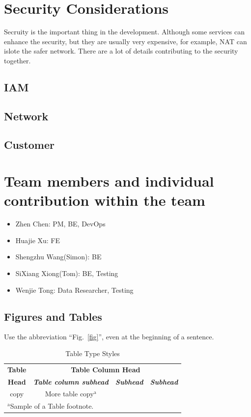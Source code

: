 \documentclass[conference]{IEEEtran}
\begin{document}
\section{Security Considerations}
Secruity is the important thing in the development. Although some services can enhance the security, but they are usually very expensive, for example, 
NAT can islote the safer network. There are a lot of details contributing to the security together.

\subsection{IAM}

\subsection{Network}

\subsection{Customer}



\section{Team members and individual contribution within the team}
\begin{itemize}
    \item Zhen Chen:  PM, BE, DevOps
    \item Huajie Xu: FE
    \item Shengzhu Wang(Simon): BE
    \item SiXiang Xiong(Tom): BE, Testing
    \item Wenjie Tong: Data Researcher, Testing
\end{itemize}


\subsection{Figures and Tables}
 Use the abbreviation 
``Fig.~\ref{fig}'', even at the beginning of a sentence.

\begin{table}[htbp]
\caption{Table Type Styles}
\begin{center}
\begin{tabular}{|c|c|c|c|}
\hline
\textbf{Table}&\multicolumn{3}{|c|}{\textbf{Table Column Head}} \\
\cline{2-4} 
\textbf{Head} & \textbf{\textit{Table column subhead}}& \textbf{\textit{Subhead}}& \textbf{\textit{Subhead}} \\
\hline
copy& More table copy$^{\mathrm{a}}$& &  \\
\hline
\multicolumn{4}{l}{$^{\mathrm{a}}$Sample of a Table footnote.}
\end{tabular}
\label{tab1}
\end{center}
\end{table}
\end{document}

